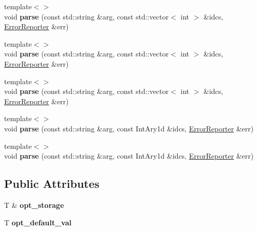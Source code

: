 \begin{DoxyCompactItemize}
{\footnotesize template$<$$>$ }\\void {\bfseries parse} (const std\+::string \&arg, const std\+::vector$<$ int $>$ \&idcs, \hyperlink{structdf_1_1program__options__lite_1_1_error_reporter}{Error\+Reporter} \&err)
\item 
\mbox{\label{structdf_1_1program__options__lite_1_1_option_a4ff45180263bba562fdee9193d39c6ca}} 
{\footnotesize template$<$$>$ }\\void {\bfseries parse} (const std\+::string \&arg, const std\+::vector$<$ int $>$ \&idcs, \hyperlink{structdf_1_1program__options__lite_1_1_error_reporter}{Error\+Reporter} \&err)
\item 
\mbox{\label{structdf_1_1program__options__lite_1_1_option_a609bddd503b6656239b8c15c16074617}} 
{\footnotesize template$<$$>$ }\\void {\bfseries parse} (const std\+::string \&arg, const std\+::vector$<$ int $>$ \&idcs, \hyperlink{structdf_1_1program__options__lite_1_1_error_reporter}{Error\+Reporter} \&err)
\item 
\mbox{\label{structdf_1_1program__options__lite_1_1_option_aa2100f00d2c18b7d92b689044617869e}} 
{\footnotesize template$<$$>$ }\\void {\bfseries parse} (const std\+::string \&arg, const Int\+Ary1d \&idcs, \hyperlink{structdf_1_1program__options__lite_1_1_error_reporter}{Error\+Reporter} \&err)
\item 
\mbox{\label{structdf_1_1program__options__lite_1_1_option_a9f7c14bf343c7d20217a32f0b7ebda0f}} 
{\footnotesize template$<$$>$ }\\void {\bfseries parse} (const std\+::string \&arg, const Int\+Ary1d \&idcs, \hyperlink{structdf_1_1program__options__lite_1_1_error_reporter}{Error\+Reporter} \&err)
\end{DoxyCompactItemize}
\subsection*{Public Attributes}
\begin{DoxyCompactItemize}
\item 
\mbox{\label{structdf_1_1program__options__lite_1_1_option_ae45670761ecfa6a083903cbc0dad6cfb}} 
T \& {\bfseries opt\+\_\+storage}
\item 
\mbox{\label{structdf_1_1program__options__lite_1_1_option_ae6ff1c76bc8657da45fca6a67f07be69}} 
T {\bfseries opt\+\_\+default\+\_\+val}
\end{DoxyCompactItemize}


